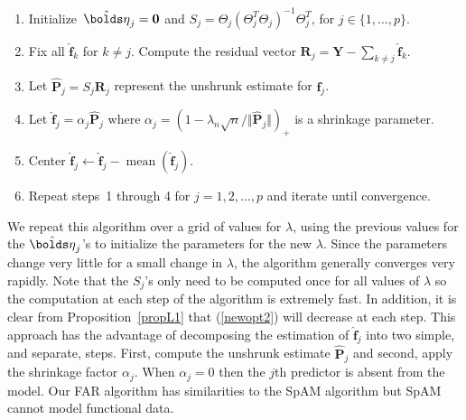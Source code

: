 \documentclass[aos,MSNbibl,dvips]{arximspdf}
\newcommand{\rrVert}{\Vert}
\newcommand{\llVert}{\Vert}
\newcommand{\bfeta}{\bolds\eta}
\newcommand{\bY}{{\mathbf Y}}
\newcommand{\bR}{{\mathbf R}}
\newcommand{\bP}{{\mathbf P}}
\newcommand{\bff}{{\mathbf f}}
\newcommand{\hf}{\hat{\bff}}
\begin{document}
\begin{center}
%
\begin{algorithm}[b] \caption{\textbf{Linear FAR algorithm}}
\label{alglin}
%
\begin{enumerate}
%
\item[0.] Initialize~$\hat{\bfeta}_j={\mathbf0}$ and $S_j=\Theta
_j (\Theta_j^T\Theta_j )^{-1} \Theta_j^T$, for $j\in\{
1,\ldots,p\}$.
%
\item[1.] Fix all $\hf_k$ for $k\ne j$. Compute the residual vector
$\bR_j = \bY-
\sum_{k\ne j} \hf_k$.
%
\item[2.] Let $\widehat\bP_j = S_j \bR_j$ represent the unshrunk
estimate for $\bff_j$.\vspace*{2pt}
%
\item[3.] Let $\hf_j = \alpha_j \widehat\bP_j$ where $\alpha_j =
(1-\lambda_n\sqrt n/\llVert \widehat\bP_j\rrVert )_+$ is a
shrinkage parameter.\vspace*{3pt}
%
\item[4.] Center $\hf_j \leftarrow\hf_j - \operatorname{mean}(\hf_j)$.\vspace*{2pt}
%
\item[5.] Repeat steps~1 through 4 for $j=1,2,\ldots, p$ and iterate until
convergence.
\end{enumerate}
%
\end{algorithm}
%
\end{center}

We repeat this algorithm over a grid of values for $\lambda$, using
the previous values for the $\hat{\bfeta}_j$'s to initialize the
parameters for the new $\lambda$.
Since the parameters change very little for a small change in $\lambda
$, the algorithm generally converges very rapidly. Note that the
$S_j$'s only need to be computed
once for all values of $\lambda$ so the computation at each step of
the algorithm is extremely fast. In addition, it is clear from
Proposition~\ref{propL1} that
(\ref{newopt2}) will decrease at each step. This approach has the
advantage of
decomposing the estimation of $\hf_j$ into two simple, and separate,
steps. First, compute the unshrunk estimate $\widehat\bP_j$ and second,
apply the shrinkage factor $\alpha_j$. When $\alpha_j=0$ then the $j$th
predictor is absent from the model. Our FAR algorithm has similarities
to the SpAM algorithm \cite{ravikumar1} but SpAM cannot model
functional data.
\end{document}
